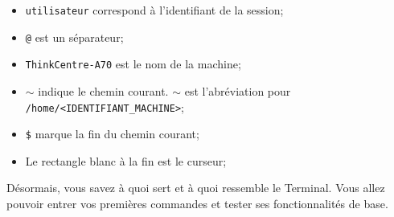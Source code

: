 \documentclass[12pt]{book}
\begin{document}
	\begin{itemize}
		\item \texttt{utilisateur} correspond à l'identifiant de la session;
		\item \texttt{@} est un séparateur;
		\item \texttt{ThinkCentre-A70} est le nom de la machine;
		\item \texttt{$\sim$} indique le chemin courant. $\sim$ est l'abréviation pour \texttt{/home/<IDENTIFIANT\_MACHINE>};
		\item \texttt{\$} marque la fin du chemin courant;
		\item Le rectangle blanc à la fin est le curseur;
	\end{itemize}\par
	Désormais, vous savez à quoi sert et à quoi ressemble le Terminal. 
	Vous allez pouvoir entrer vos premières commandes et tester ses fonctionnalités de base.
\end{document}
